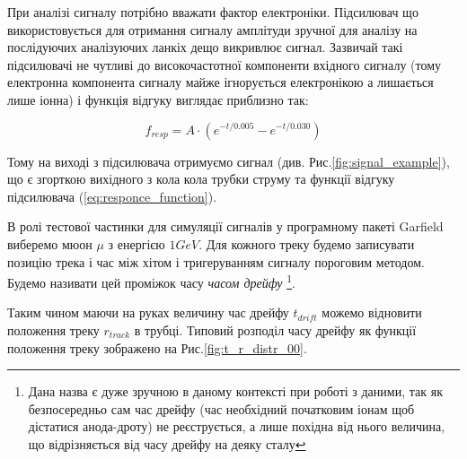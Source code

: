 \documentclass[pdftex,14pt]{scrartcl}
\begin{document}
	При аналізі сигналу потрібно вважати фактор електроніки. Підсилювач що використовується для отримання сигналу амплітуди зручної для аналізу на послідуючих аналізуючих ланкіх дещо викривлює сигнал. Зазвичай такі підсилювачі не чутливі до високочастотної компоненти вхідного сигналу (тому електронна компонента сигналу майже ігнорується електронікою а лишається лише іонна) і функція відгуку виглядає приблизно так:
	
	\begin{equation}
	f_{resp} =  A\cdot(e^{-t/0.005} - e^{-t/0.030})
	\label{eq:responce_function}
	\end{equation}

	Тому на виході з підсилювача отримуємо сигнал (див. Рис.\ref{fig:signal_example}), що є згорткою вихідного з кола кола трубки струму та функції відгуку підсилювача (\ref{eq:responce_function}).
	
	В ролі тестової частинки для симуляції сигналів у програмному пакеті Garfield виберемо мюон $\mu$ з енергією $1GeV$. Для кожного треку будемо записувати позицію трека і час між хітом і тригеруванням сигналу пороговим методом. Будемо називати цей проміжок часу {\it часом дрейфу} \footnote{Дана назва є дуже зручною в даному контексті при роботі з даними, так як безпосередньо сам час дрейфу (час необхідний початковим іонам щоб дістатися анода-дроту) не реєструється, а лише похідна від нього величина, що відрізняється від часу дрейфу на деяку сталу}.
	
	Таким чином маючи на руках величину час дрейфу $t_{drift}$ можемо відновити положення треку $r_{track}$ в трубці. Типовий розподіл часу дрейфу як функції положення треку зображено на Рис.\ref{fig:t_r_distr_00}.
	
	

	
\end{document}
